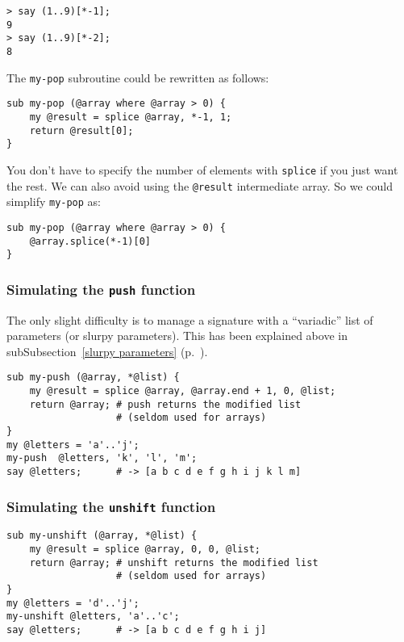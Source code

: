 {\begin{verbatim}
> say (1..9)[*-1];
9
> say (1..9)[*-2];
8
\end{verbatim}

The {\tt my-pop} subroutine could be rewritten as follows:

\begin{verbatim}
sub my-pop (@array where @array > 0) {
    my @result = splice @array, *-1, 1;
    return @result[0];
}
\end{verbatim}

You don't have to specify the number of elements with 
{\tt splice} if you just want the rest. We can also 
avoid using the \verb'@result'  intermediate array. 
So we could simplify {\tt my-pop} as:

\begin{verbatim}
sub my-pop (@array where @array > 0) {
    @array.splice(*-1)[0]
}
\end{verbatim}


\subsubsection{Simulating the {\tt push} function}

The only slight difficulty is to manage a signature with a 
``variadic'' list of parameters (or slurpy parameters). This 
has been explained above in subSubsection~\ref{slurpy 
parameters} (p.~\pageref{slurpy parameters}).

\begin{verbatim}
sub my-push (@array, *@list) {
    my @result = splice @array, @array.end + 1, 0, @list;
    return @array; # push returns the modified list
                   # (seldom used for arrays)
}
my @letters = 'a'..'j';
my-push  @letters, 'k', 'l', 'm';
say @letters;      # -> [a b c d e f g h i j k l m]
\end{verbatim}

\subsubsection{Simulating the {\tt unshift} function}

\begin{verbatim}
sub my-unshift (@array, *@list) {
    my @result = splice @array, 0, 0, @list;
    return @array; # unshift returns the modified list
                   # (seldom used for arrays)
}
my @letters = 'd'..'j';
my-unshift @letters, 'a'..'c';
say @letters;      # -> [a b c d e f g h i j]
\end{verbatim}

}
